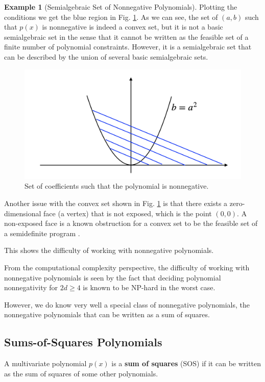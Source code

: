 \documentclass[
]{book}
\theoremstyle{definition}
\theoremstyle{definition}
\newtheorem{example}{Example}[chapter]
\theoremstyle{definition}
\theoremstyle{definition}
\theoremstyle{remark}
\begin{document}
\begin{example}[Semialgebraic Set of Nonnegative Polynomials]
Plotting the conditions we get the blue region in Fig. \ref{fig:NonnegativeQuartic}. As we can see, the set of \((a,b)\) such that \(p(x)\) is nonnegative is indeed a convex set, but it is not a basic semialgebraic set in the sense that it cannot be written as the feasible set of a finite number of polynomial constraints. However, it is a semialgebraic set that can be described by the union of several basic semialgebraic sets.

\begin{figure}

{\centering \includegraphics[width=0.6\linewidth]{images/nonnegative_quartic} 

}

\caption{Set of coefficients such that the polynomial is nonnegative.}\label{fig:NonnegativeQuartic}
\end{figure}

Another issue with the convex set shown in Fig. \ref{fig:NonnegativeQuartic} is that there exists a zero-dimensional face (a vertex) that is not exposed, which is the point \((0,0)\). A non-exposed face is a known obstruction for a convex set to be the feasible set of a semidefinite program \citep{ramana95jgo-some}.
\end{example}

This shows the difficulty of working with nonnegative polynomials.

From the computational complexity perspective, the difficulty of working with nonnegative polynomials is seen by the fact that deciding polynomial nonnegativity for \(2d \geq 4\) is known to be NP-hard in the worst case.

However, we do know very well a special class of nonnegative polynomials, the nonnegative polynomials that can be written as a sum of squares.

\subsection{Sums-of-Squares Polynomials}\label{sums-of-squares-polynomials}

A multivariate polynomial \(p(x)\) is a \textbf{sum of squares} (SOS) if it can be written as the sum of squares of some other polynomials.
\end{document}
